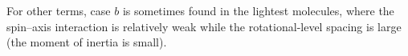 For other terms, case $b$ is sometimes found in the lightest molecules, where the spin--axis interaction is relatively weak while the rotational-level spacing is large (the moment of inertia is small).
